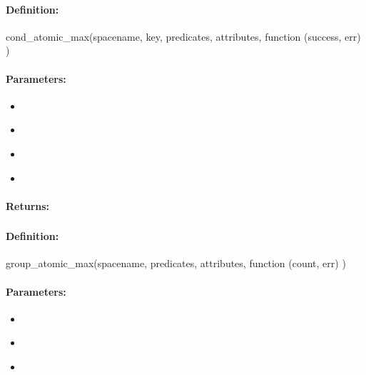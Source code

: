 \paragraph{Definition:}
\begin{javascriptcode}
cond_atomic_max(spacename, key, predicates, attributes, function (success, err) {})
\end{javascriptcode}
\paragraph{Parameters:}
\begin{itemize}[noitemsep]
\item {}\\

\item {}\\

\item {}\\

\item {}\\

\end{itemize}

\paragraph{Returns:}


\pagebreak
\subsubsection{}
\label{api:nodejs:group_atomic_max}


\paragraph{Definition:}
\begin{javascriptcode}
group_atomic_max(spacename, predicates, attributes, function (count, err) {})
\end{javascriptcode}
\paragraph{Parameters:}
\begin{itemize}[noitemsep]
\item {}\\

\item {}\\

\item {}\\

\end{itemize}

